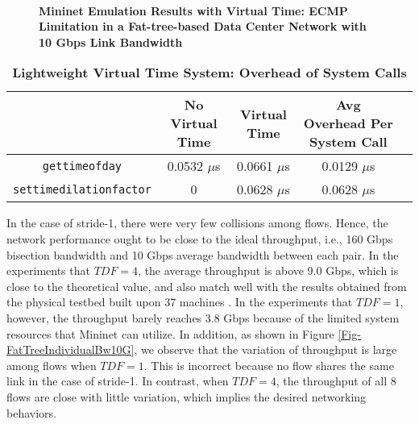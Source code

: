 \begin{figure*}[htbp]
\centering

	~

\caption{\textbf{Mininet Emulation Results with Virtual Time: ECMP Limitation in a Fat-tree-based Data Center Network with 10 Gbps Link Bandwidth}}
\end{figure*}

\begin{table*}
\centering
\caption{\textbf{Lightweight Virtual Time System: Overhead of System Calls}}
\begin{tabular}{|c|c|c|c|c|} 
\hline
 & No Virtual Time & Virtual Time & Avg Overhead Per System Call \\%
\hline
\texttt{gettimeofday}  & 0.0532 $\mu$s & 0.0661 $\mu$s & 0.0129 $\mu$s\\%
\hline
\texttt{settimedilationfactor} & 0  & 0.0628 $\mu$s & 0.0628 $\mu$s\\%
\hline
\end{tabular}
\label{Tab-Overhead}
\end{table*}


In the case of stride-1, there were very few collisions among flows. Hence, the network performance ought to be close to the ideal throughput, i.e., 160 Gbps bisection bandwidth and 10 Gbps average bandwidth between each pair. In the experiments that $TDF=4$, the average throughput is above 9.0 Gbps, which is close to the theoretical value, and also match well with the results obtained from the physical testbed built upon 37 machines \cite{Hedera}. In the experiments that $TDF=1$, however, the throughput barely reaches 3.8 Gbps because of the limited system resources that Mininet can utilize. In addition, as shown in Figure \ref{Fig-FatTreeIndividualBw10G}, we observe that the variation of throughput is large among flows when $TDF=1$. This is incorrect because no flow shares the same link in the case of stride-1. In contrast, when $TDF = 4$, the throughput of all 8 flows are close with little variation, which implies the desired networking behaviors. 

